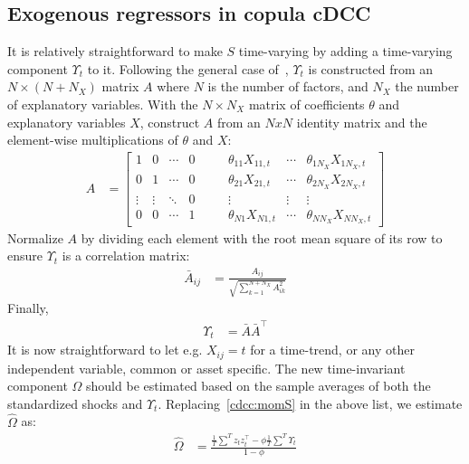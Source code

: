 \subsection{Exogenous regressors in copula cDCC}
It is relatively straightforward to make $S$ time-varying by adding a time-varying component $\Upsilon_t$ to it. Following the general case of~\autocite{ChristoffersenErrunzaJacobLanglois2012}, $\Upsilon_t$ is constructed from an $N\times(N + N_X)$ matrix $A$ where $N$ is the number of factors, and $N_X$ the number of explanatory variables. With the $N \times N_X$ matrix of coefficients $\theta$ and explanatory variables $X$, construct $A$ from an $NxN$ identity matrix and the element-wise multiplications of $\theta$ and $X$:
\begin{align}
  A &=
    \begin{bmatrix}
    1 & 0 & \cdots & 0            & \quad & \theta_{11} X_{11,t} & \cdots & \theta_{1N_X} X_{1N_X,t} \\
    0 & 1 & \cdots & 0            & \quad & \theta_{21} X_{21,t} & \cdots & \theta_{2N_X} X_{2N_X,t} \\
    \vdots & \vdots & \ddots & 0  & \quad & \vdots &               \vdots & \vdots \\
    0 & 0 & \cdots & 1            & \quad & \theta_{N1} X_{N1,t} & \cdots & \theta_{NN_X} X_{NN_X,t}
    \end{bmatrix}
\end{align}
Normalize $A$ by dividing each element with the root mean square of its row to ensure $\Upsilon_t$ is a correlation matrix:
\begin{align}
  \bar{A}_{ij} &= \frac{A_{ij}}{\sqrt{\sum_{k = 1}^{N + N_X} A_{ik}^2}}
\end{align}
Finally,
\begin{align}
  \Upsilon_t &= \bar{A} \bar{A}^\top
\end{align}
It is now straightforward to let e.g. $X_{ij} = t$ for a time-trend, or any other independent variable, common or asset specific. The new time-invariant component $\Omega$ should be estimated based on the sample averages of both the standardized shocks and $\Upsilon_t$. Replacing~\autoref{cdcc:momS} in the above list, we estimate $\hat{\Omega}$ as:
\begin{align}
  \hat{\Omega} &=
    \frac{
      \frac{1}{T} \sum^{T} z_t z_t^\top -
      \phi
      \frac{1}{T} \sum^{T} \Upsilon_t
    }{1 - \phi}
\end{align}

\newpage
